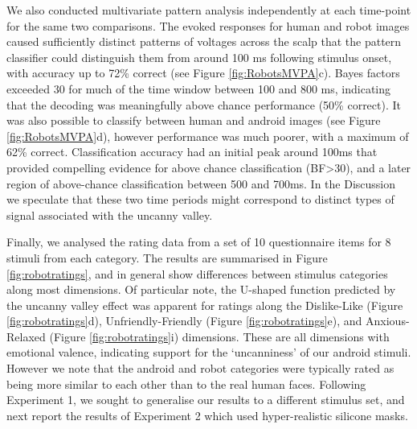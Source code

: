 \documentclass[
]{article}
\begin{document}
We also conducted multivariate pattern analysis independently at each time-point for the same two comparisons. The evoked responses for human and robot images caused sufficiently distinct patterns of voltages across the scalp that the pattern classifier could distinguish them from around 100 ms following stimulus onset, with accuracy up to 72\% correct (see Figure \ref{fig:RobotsMVPA}c). Bayes factors exceeded 30 for much of the time window between 100 and 800 ms, indicating that the decoding was meaningfully above chance performance (50\% correct). It was also possible to classify between human and android images (see Figure \ref{fig:RobotsMVPA}d), however performance was much poorer, with a maximum of 62\% correct. Classification accuracy had an initial peak around 100ms that provided compelling evidence for above chance classification (BF\textgreater30), and a later region of above-chance classification between 500 and 700ms. In the Discussion we speculate that these two time periods might correspond to distinct types of signal associated with the uncanny valley.

Finally, we analysed the rating data from a set of 10 questionnaire items for 8 stimuli from each category. The results are summarised in Figure \ref{fig:robotratings}, and in general show differences between stimulus categories along most dimensions. Of particular note, the U-shaped function predicted by the uncanny valley effect was apparent for ratings along the Dislike-Like (Figure \ref{fig:robotratings}d), Unfriendly-Friendly (Figure \ref{fig:robotratings}e), and Anxious-Relaxed (Figure \ref{fig:robotratings}i) dimensions. These are all dimensions with emotional valence, indicating support for the `uncanniness' of our android stimuli. However we note that the android and robot categories were typically rated as being more similar to each other than to the real human faces. Following Experiment 1, we sought to generalise our results to a different stimulus set, and next report the results of Experiment 2 which used hyper-realistic silicone masks.
\end{document}
